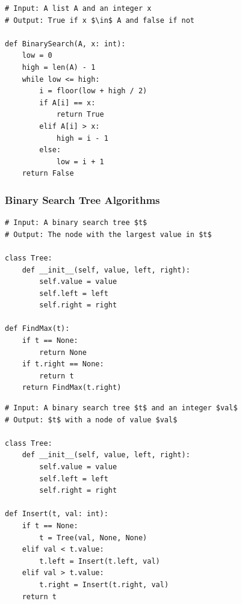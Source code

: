 \begin{lstlisting}[caption={The result of transpiling \Cref{binarySearchGourmet} to Python.}, captionpos=b, label={binarySearchPython}]
# Input: A list A and an integer x
# Output: True if x $\in$ A and false if not

def BinarySearch(A, x: int):
    low = 0
    high = len(A) - 1
    while low <= high:
        i = floor(low + high / 2)
        if A[i] == x:
            return True
        elif A[i] > x:
            high = i - 1
        else:
            low = i + 1
    return False
\end{lstlisting}


\subsubsection{Binary Search Tree Algorithms}

\begin{lstlisting}[caption={The result of transpiling \Cref{findMaxGourmet} to Python.}, captionpos=b, label={findMaxPython}]
# Input: A binary search tree $t$
# Output: The node with the largest value in $t$

class Tree:
    def __init__(self, value, left, right):
        self.value = value
        self.left = left
        self.right = right

def FindMax(t):
    if t == None:
        return None
    if t.right == None:
        return t
    return FindMax(t.right)
\end{lstlisting}

\begin{lstlisting}[caption={The result of transpiling \Cref{insertGourmet} to Python.}, captionpos=b, label={insertPython}]
# Input: A binary search tree $t$ and an integer $val$
# Output: $t$ with a node of value $val$

class Tree:
    def __init__(self, value, left, right):
        self.value = value
        self.left = left
        self.right = right

def Insert(t, val: int):
    if t == None:
        t = Tree(val, None, None)
    elif val < t.value:
        t.left = Insert(t.left, val)
    elif val > t.value:
        t.right = Insert(t.right, val)
    return t
\end{lstlisting}


